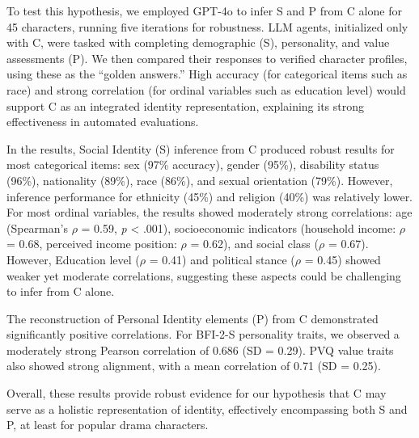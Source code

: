 To test this hypothesis, we employed GPT-4o to infer S and P from C alone for 45 characters, running five iterations for robustness. LLM agents, initialized only with C, were tasked with completing demographic (S), personality, and value assessments (P). We then compared their responses to verified character profiles, using these as the ``golden answers.'' High accuracy (for categorical items such as race) and strong correlation (for ordinal variables such as education level) would support C as an integrated identity representation, explaining its strong effectiveness in automated evaluations.

In the results, Social Identity (S) inference from C produced robust results for most categorical items: sex (97\% accuracy), gender (95\%), disability status (96\%), nationality (89\%), race (86\%), and sexual orientation (79\%).  However, inference performance for ethnicity (45\%) and religion (40\%) was relatively lower. For most ordinal variables, the results showed moderately strong correlations: age (Spearman's $\rho$ = 0.59, \textit{p} < .001),  socioeconomic indicators (household income: $\rho$ = 0.68, perceived income position: $\rho$ = 0.62), and social class ($\rho$ = 0.67). However, Education level ($\rho$ = 0.41) and political stance ($\rho$ = 0.45) showed weaker yet moderate correlations, suggesting these aspects could be challenging to infer from C alone.

The reconstruction of Personal Identity elements (P) from C demonstrated significantly positive correlations. For BFI-2-S personality traits, we observed a moderately strong Pearson correlation of 0.686 (SD = 0.29). PVQ value traits also showed strong alignment, with a mean correlation of 0.71 (SD = 0.25).

Overall, these results provide robust evidence for our hypothesis that C may serve as a holistic representation of identity, effectively encompassing both S and P, at least for popular drama characters.


